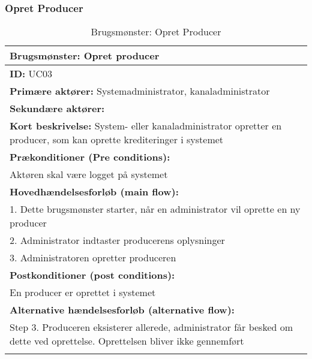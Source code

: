 % 
\subsubsection{Opret Producer} %
\begin{longtable}[h]{|p{16cm}|} \hline
\textbf{Brugsmønster:}  Opret producer \\ \hline
\textbf{ID:} UC03 \\ \hline
\textbf{Primære aktører:} Systemadministrator, kanaladministrator \\ \hline
\textbf{Sekundære aktører:} \\ \hline
\textbf{Kort beskrivelse:} System- eller kanaladministrator opretter en producer, som kan oprette       krediteringer i systemet \\ \hline
\textbf{Prækonditioner (Pre conditions):} \\
Aktøren skal være logget på systemet \\ \hline
\textbf{Hovedhændelsesforløb (main flow):} \\
    1. Dette brugsmønster starter, når en administrator vil oprette en ny producer \\
    2. Administrator indtaster producerens oplysninger \\ 
    3. Administratoren opretter produceren \\ \hline
\textbf{Postkonditioner (post conditions):} \\
    En producer er oprettet i systemet \\ \hline
\textbf{Alternative hændelsesforløb (alternative flow):} \\ Step 3. Produceren eksisterer allerede,     administrator får besked om dette ved oprettelse. Oprettelsen bliver ikke gennemført \\
\hline
\caption{Brugsmønster: Opret Producer}
\label{table:create_producer}
\end{longtable}


